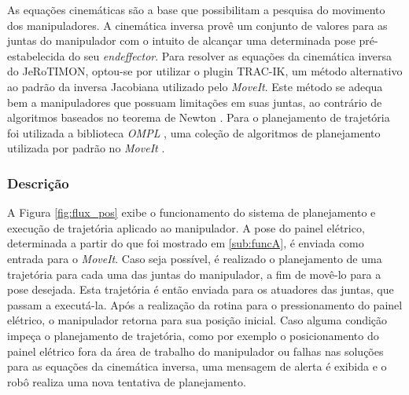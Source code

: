 As equações cinemáticas são a base que possibilitam a pesquisa do movimento dos manipuladores. A cinemática inversa provê um conjunto de valores para as juntas do manipulador com o intuito de alcançar uma determinada pose pré-estabelecida do seu \textit{endeffector}. Para resolver as equações da cinemática inversa do JeRoTIMON, optou-se por utilizar o plugin TRAC-IK, um método alternativo ao padrão da inversa Jacobiana utilizado pelo \textit{MoveIt}. Este método se adequa bem a manipuladores que possuam limitações em suas juntas, ao contrário de algoritmos baseados no teorema de Newton \cite{beeson2015trac}. Para o planejamento de trajetória foi utilizada a biblioteca \textit{\acs{OMPL}} , uma coleção de algoritmos de planejamento utilizada por padrão no \textit{MoveIt} \cite{sucan2012open}.

\subsubsection{Descrição} 
\label{ssub:descB}

A Figura \ref{fig:flux_pos} exibe o funcionamento do sistema de planejamento e execução de trajetória aplicado ao manipulador. A pose do painel elétrico, determinada a partir do que foi mostrado em \ref{sub:funcA}, é enviada como entrada para o \textit{MoveIt}. Caso seja possível, é realizado o planejamento de uma trajetória para cada uma das juntas do manipulador, a fim de movê-lo para a pose desejada. Esta trajetória é então enviada para os atuadores das juntas, que passam a executá-la. Após a realização da rotina para o pressionamento do painel elétrico, o manipulador retorna para sua posição inicial. Caso alguma condição impeça o planejamento de trajetória, como por exemplo o posicionamento do painel elétrico fora da área de trabalho do manipulador ou falhas nas soluções para as equações da cinemática inversa, uma mensagem de alerta é exibida e o robô realiza uma nova tentativa de planejamento.

